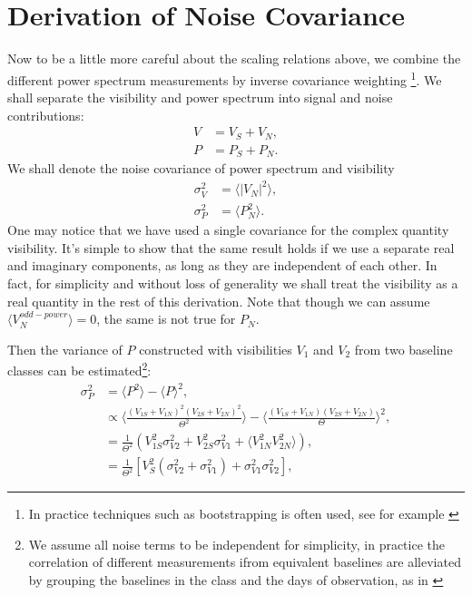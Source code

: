\documentclass[preprint2,numberedappendix,tighten,twocolappendix]{aastex6}  %
\renewcommand\[{\begin{equation}}
\renewcommand\]{\end{equation}}
\begin{document}
\section{\\Derivation of Noise Covariance \label{sec:appB}}

Now to be a little more careful about the scaling relations above, we combine the different power spectrum measurements by inverse covariance weighting \footnote{In practice techniques such as bootstrapping is often used, see for example \citep{Ali2015}}. We shall separate the visibility and power spectrum into signal and noise contributions:
\begin{equation}
\begin{aligned}
V &= V_S+V_N,\\
P &= P_S+P_N.
\end{aligned}
\end{equation}
We shall denote the noise covariance of power spectrum and visibility
\begin{equation}
\begin{aligned}
\sigma_V^2 &= \langle |V_N|^2 \rangle,\\
\sigma_P^2 &= \langle P_N^2 \rangle.
\end{aligned}
\end{equation}
One may notice that we have used a single covariance for the complex quantity visibility. It's simple to show that the same result holds if we use a separate real and imaginary components, as long as they are independent of each other. In fact, for simplicity and without loss of generality we shall treat the visibility as a real quantity in the rest of this derivation. 
Note that though we can assume $\langle V_N^{odd-power}\rangle=0$, the same is not true for $P_N$. 

Then the variance of $P$ constructed with visibilities $V_1$ and $V_2$ from two baseline classes can be estimated\footnote{We assume all noise terms to be independent for simplicity, in practice the correlation of different measurements ifrom equivalent baselines are alleviated by grouping the baselines in the class and the days of observation, as in \cite{Ali2015}}:
\begin{equation}
\begin{aligned}
\sigma_P^2 &= \langle P^2\rangle -\langle P \rangle^2,\\
&\propto \langle \frac{(V_{1S}+V_{1N})^2 (V_{2S}+V_{2N})^2}{\Theta^2} \rangle - \langle \frac{(V_{1S}+V_{1N}) (V_{2S}+V_{2N})}{\Theta} \rangle ^2,\\
&= \frac{1}{\Theta^2} \left( V_{1S}^2\sigma_{V2}^2+V_{2S}^2\sigma_{V1}^2+\langle V_{1N}^2 V_{2N}^2\rangle\right), \\
&= \frac{1}{\Theta^2} \left[ V_{S}^2(\sigma_{V2}^2+\sigma_{V1}^2) + \sigma_{V1}^2 \sigma_{V2}^2\right], 
\end{aligned}
\end{equation}
\end{document}
